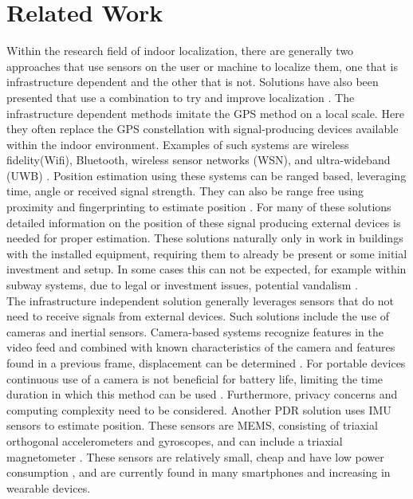 \chapter{Related Work}

Within the research field of indoor localization, there are generally two approaches that use sensors on the user or machine to localize them, one that is infrastructure dependent and the other that is not. Solutions have also been presented that use a combination to try and improve localization \cite{Gu2019, Correa2017}.
The infrastructure dependent methods imitate the GPS method on a local scale. Here they often replace the GPS constellation with signal-producing devices available within the indoor environment. Examples of such systems are wireless fidelity(Wifi), Bluetooth, wireless sensor networks (WSN), and ultra-wideband (UWB) \cite{Wu2019,Jackermeier2018,Davidson2017}. Position estimation using these systems can be ranged based, leveraging time, angle or received signal strength. They can also be range free using proximity and fingerprinting to estimate position \cite{Correa2017, Tariq2017}. For many of these solutions detailed information on the position of these signal producing external devices is needed for proper estimation. These solutions naturally only in work in buildings with the installed equipment, requiring them to already be present or some initial investment and setup. In some cases this can not be expected, for example within subway systems, due to legal or investment issues, potential vandalism \cite{Torok2014}. \\
The infrastructure independent solution generally leverages sensors that do not need to receive signals from external devices. Such solutions include the use of cameras and inertial sensors. Camera-based systems recognize features in the video feed and combined with known characteristics of the camera and features found in a previous frame, displacement can be determined \cite{Gu2019}. For portable devices continuous use of a camera is not beneficial for battery life, limiting the time duration in which this method can be used \cite{Yang2014}. Furthermore, privacy concerns and computing complexity need to be considered. Another PDR solution uses \ac{IMU} sensors to estimate position. These sensors are \ac{MEMS},  consisting of triaxial orthogonal accelerometers and gyroscopes, and can include a triaxial magnetometer \cite{Yang2014}. These sensors are   relatively small, cheap and have low power consumption \cite{Olsson2016}, and are currently found in many smartphones and increasing in wearable devices.\par

